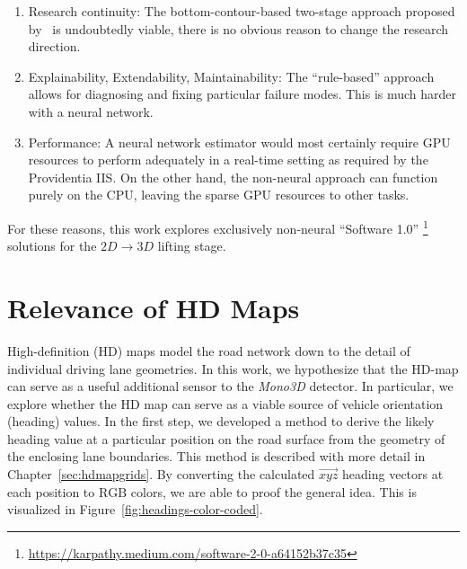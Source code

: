 \begin{enumerate}
    \item Research continuity: The bottom-contour-based two-stage approach proposed by~\cite{leonthesis} is undoubtedly viable, there is no obvious reason to change the research direction.
    \item Explainability, Extendability, Maintainability: The \enquote{rule-based} approach allows for diagnosing and fixing particular failure modes.
    This is much harder with a neural network.
    \item Performance: A neural network estimator would most certainly require GPU resources to perform adequately in a real-time setting as required by the Providentia IIS. On the other hand, the non-neural approach can function purely on the CPU, leaving the sparse GPU resources to other tasks.
\end{enumerate}

For these reasons, this work explores exclusively non-neural \enquote{Software 1.0} \footnote{\hyperlink{https://karpathy.medium.com/software-2-0-a64152b37c35}{https://karpathy.medium.com/software-2-0-a64152b37c35}} solutions for the $2D \rightarrow 3D$ lifting stage.

\section{Relevance of HD Maps}
\label{sec:hdmap}

High-definition (HD) maps model the road network down to the detail of individual driving lane geometries.
In this work, we hypothesize that the HD-map can serve as a useful additional sensor to the \textit{Mono3D} detector.
In particular, we explore whether the HD map can serve as a viable source of vehicle orientation (heading) values.
In the first step, we developed a method to derive the likely heading value at a particular position on the road surface from the geometry of the enclosing lane boundaries.
This method is described with more detail in Chapter~\ref{sec:hdmapgrids}.
By converting the calculated $\overrightarrow{xyz}$ heading vectors at each position to $\text{RGB}$ colors, we are able to proof the general idea.
This is visualized in Figure~\ref{fig:headings-color-coded}.

